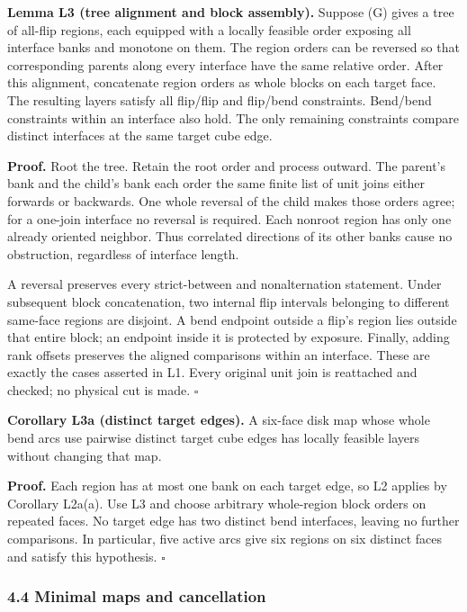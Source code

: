 \documentclass[
  11pt,
]{article}
\begin{document}
\textbf{Lemma L3 (tree alignment and block assembly).} Suppose (G) gives
a tree of all-flip regions, each equipped with a locally feasible order
exposing all interface banks and monotone on them. The region orders can
be reversed so that corresponding parents along every interface have the
same relative order. After this alignment, concatenate region orders as
whole blocks on each target face. The resulting layers satisfy all
flip/flip and flip/bend constraints. Bend/bend constraints within an
interface also hold. The only remaining constraints compare distinct
interfaces at the same target cube edge.

\textbf{Proof.} Root the tree. Retain the root order and process
outward. The parent's bank and the child's bank each order the same
finite list of unit joins either forwards or backwards. One whole
reversal of the child makes those orders agree; for a one-join interface
no reversal is required. Each nonroot region has only one already
oriented neighbor. Thus correlated directions of its other banks cause
no obstruction, regardless of interface length.

A reversal preserves every strict-between and nonalternation statement.
Under subsequent block concatenation, two internal flip intervals
belonging to different same-face regions are disjoint. A bend endpoint
outside a flip's region lies outside that entire block; an endpoint
inside it is protected by exposure. Finally, adding rank offsets
preserves the aligned comparisons within an interface. These are exactly
the cases asserted in L1. Every original unit join is reattached and
checked; no physical cut is made. \(\square\)

\textbf{Corollary L3a (distinct target edges).} A six-face disk map
whose whole bend arcs use pairwise distinct target cube edges has
locally feasible layers without changing that map.

\textbf{Proof.} Each region has at most one bank on each target edge, so
L2 applies by Corollary L2a(a). Use L3 and choose arbitrary whole-region
block orders on repeated faces. No target edge has two distinct bend
interfaces, leaving no further comparisons. In particular, five active
arcs give six regions on six distinct faces and satisfy this hypothesis.
\(\square\)

\subsubsection{4.4 Minimal maps and
cancellation}\label{minimal-maps-and-cancellation}
\end{document}
